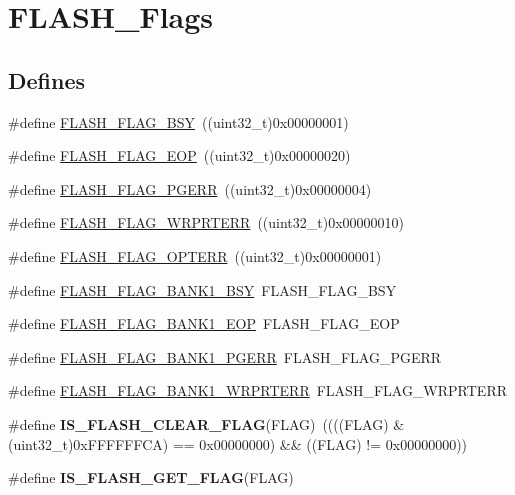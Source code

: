 \hypertarget{group__FLASH__Flags}{
\section{FLASH\_\-Flags}
\label{group__FLASH__Flags}
}
\subsection*{Defines}
\begin{DoxyCompactItemize}
\item 
\#define \hyperlink{group__FLASH__Flags_gad3bc368f954ad7744deda3315da2fff7}{FLASH\_\-FLAG\_\-BSY}~((uint32\_\-t)0x00000001)
\item 
\#define \hyperlink{group__FLASH__Flags_gaf043ba4d8f837350bfc7754a99fae5a9}{FLASH\_\-FLAG\_\-EOP}~((uint32\_\-t)0x00000020)
\item 
\#define \hyperlink{group__FLASH__Flags_gae2ef62dee0a5ca01e6226746039b6f20}{FLASH\_\-FLAG\_\-PGERR}~((uint32\_\-t)0x00000004)
\item 
\#define \hyperlink{group__FLASH__Flags_ga5c59a7f07507cac38091275964d3d35d}{FLASH\_\-FLAG\_\-WRPRTERR}~((uint32\_\-t)0x00000010)
\item 
\#define \hyperlink{group__FLASH__Flags_gac36b0605df97c9414933369a32251e4a}{FLASH\_\-FLAG\_\-OPTERR}~((uint32\_\-t)0x00000001)
\item 
\#define \hyperlink{group__FLASH__Flags_ga1f85e6d511503886e9fbe7d0228c97a4}{FLASH\_\-FLAG\_\-BANK1\_\-BSY}~FLASH\_\-FLAG\_\-BSY
\item 
\#define \hyperlink{group__FLASH__Flags_gafa7670ee5ce8a2eb1f64c458a9f08e5b}{FLASH\_\-FLAG\_\-BANK1\_\-EOP}~FLASH\_\-FLAG\_\-EOP
\item 
\#define \hyperlink{group__FLASH__Flags_gaa1056ffdd1c434a2967d5ed7c0d263be}{FLASH\_\-FLAG\_\-BANK1\_\-PGERR}~FLASH\_\-FLAG\_\-PGERR
\item 
\#define \hyperlink{group__FLASH__Flags_ga1646345adbcda773ef25785b1bdc4c43}{FLASH\_\-FLAG\_\-BANK1\_\-WRPRTERR}~FLASH\_\-FLAG\_\-WRPRTERR
\item 
\hypertarget{group__FLASH__Flags_ga82f8c6104c348d6aa47c7658ed3b6b36}{
\#define {\bfseries IS\_\-FLASH\_\-CLEAR\_\-FLAG}(FLAG)~((((FLAG) \& (uint32\_\-t)0xFFFFFFCA) == 0x00000000) \&\& ((FLAG) != 0x00000000))}
\label{group__FLASH__Flags_ga82f8c6104c348d6aa47c7658ed3b6b36}

\item 
\#define {\bfseries IS\_\-FLASH\_\-GET\_\-FLAG}(FLAG)
\end{DoxyCompactItemize}


